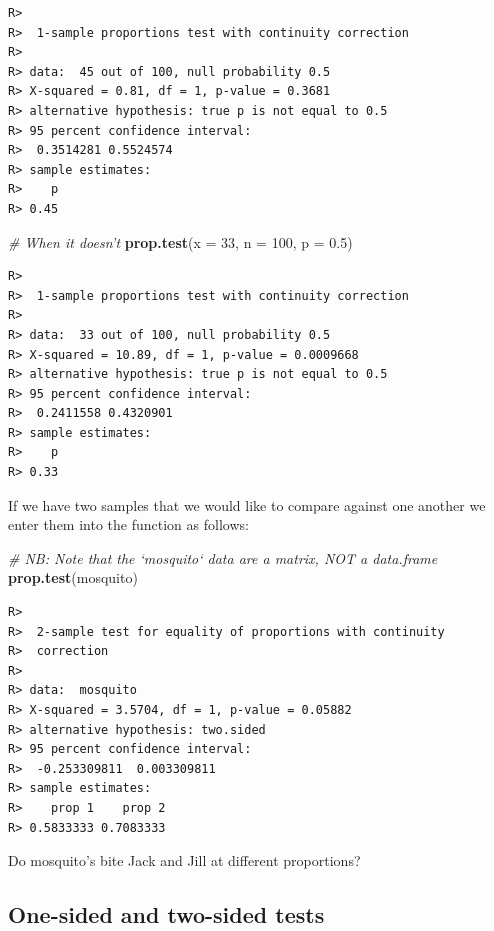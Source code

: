 \documentclass[english,10pt,a4paper,oneside]{book}
\newenvironment{Shaded}{\begin{snugshade}}{\end{snugshade}}
\newcommand{\CommentTok}[1]{\textcolor[rgb]{0.56,0.35,0.01}{\textit{#1}}}
\newcommand{\DataTypeTok}[1]{\textcolor[rgb]{0.13,0.29,0.53}{#1}}
\newcommand{\DecValTok}[1]{\textcolor[rgb]{0.00,0.00,0.81}{#1}}
\newcommand{\FloatTok}[1]{\textcolor[rgb]{0.00,0.00,0.81}{#1}}
\newcommand{\KeywordTok}[1]{\textcolor[rgb]{0.13,0.29,0.53}{\textbf{#1}}}
\newcommand{\NormalTok}[1]{#1}
\theoremstyle{definition}
\theoremstyle{definition}
\theoremstyle{definition}
\theoremstyle{remark}
\begin{document}
\begin{verbatim}
R> 
R>  1-sample proportions test with continuity correction
R> 
R> data:  45 out of 100, null probability 0.5
R> X-squared = 0.81, df = 1, p-value = 0.3681
R> alternative hypothesis: true p is not equal to 0.5
R> 95 percent confidence interval:
R>  0.3514281 0.5524574
R> sample estimates:
R>    p 
R> 0.45
\end{verbatim}

\begin{Shaded}
\begin{Highlighting}[]
\CommentTok{# When it doesn't}
\KeywordTok{prop.test}\NormalTok{(}\DataTypeTok{x =} \DecValTok{33}\NormalTok{, }\DataTypeTok{n =} \DecValTok{100}\NormalTok{, }\DataTypeTok{p =} \FloatTok{0.5}\NormalTok{)}
\end{Highlighting}
\end{Shaded}

\begin{verbatim}
R> 
R>  1-sample proportions test with continuity correction
R> 
R> data:  33 out of 100, null probability 0.5
R> X-squared = 10.89, df = 1, p-value = 0.0009668
R> alternative hypothesis: true p is not equal to 0.5
R> 95 percent confidence interval:
R>  0.2411558 0.4320901
R> sample estimates:
R>    p 
R> 0.33
\end{verbatim}

If we have two samples that we would like to compare against one another
we enter them into the function as follows:

\begin{Shaded}
\begin{Highlighting}[]
\CommentTok{# NB: Note that the `mosquito` data are a matrix, NOT a data.frame}
\KeywordTok{prop.test}\NormalTok{(mosquito)}
\end{Highlighting}
\end{Shaded}

\begin{verbatim}
R> 
R>  2-sample test for equality of proportions with continuity
R>  correction
R> 
R> data:  mosquito
R> X-squared = 3.5704, df = 1, p-value = 0.05882
R> alternative hypothesis: two.sided
R> 95 percent confidence interval:
R>  -0.253309811  0.003309811
R> sample estimates:
R>    prop 1    prop 2 
R> 0.5833333 0.7083333
\end{verbatim}

Do mosquito's bite Jack and Jill at different proportions?

\hypertarget{one-sided-and-two-sided-tests}{%
\subsection{One-sided and two-sided
tests}\label{one-sided-and-two-sided-tests}}
\end{document}
